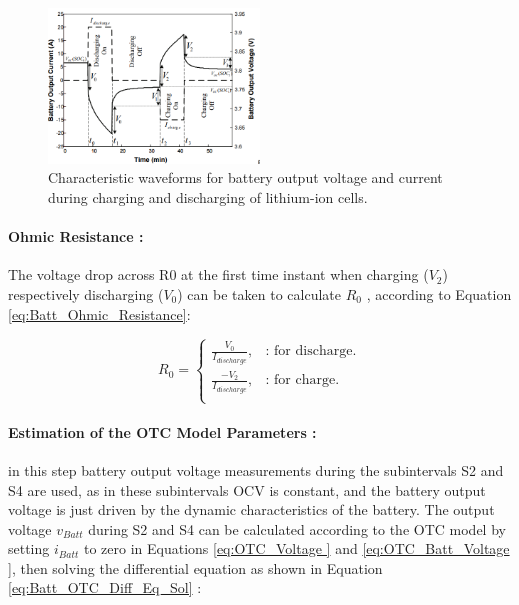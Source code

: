 \begin{figure}[h]
	\centering
	\includegraphics[width=0.5\textwidth]{Chap06/Figures/Batt_Pulsed_current_char.PNG}
	\caption{Characteristic waveforms for battery output voltage and current during charging and discharging of lithium-ion cells.}
	\label{fig:Battery_Current_Pulse}
\end{figure}

\paragraph{Ohmic Resistance :} 
The voltage drop across R0 at the 
first time instant when charging ($V_2$) respectively 
discharging ($V_0$) can be taken to calculate $R_0$ \cite{Internal_Resistance_LIPO_Batt_Gogoana}, according 
to Equation \ref{eq:Batt_Ohmic_Resistance}: 

\begin{equation}\label{eq:Batt_Ohmic_Resistance}
	R_0 =\begin{cases}
	  \frac{V_0}{I_{discharge}}, & \text{: for discharge}.\\
	  \frac{- V_2}{I_{discharge}}, & \text{: for charge}.\\
	\end{cases}
\end{equation}

\paragraph{Estimation of the OTC Model Parameters :} 
in this step 
battery output voltage measurements during the 
subintervals S2 and S4 are used, as in these subintervals 
OCV is constant\cite{Internal_Resistance_LIPO_Batt_Gogoana}, and the battery output voltage is just 
driven by the dynamic characteristics of the battery. The 
output voltage $v_{Batt}$ during S2 and S4 can be calculated 
according to the OTC model by setting $i_{Batt}$ to zero in 
Equations \ref{eq:OTC_Voltage } and \ref{eq:OTC_Batt_Voltage }, then solving the differential equation as 
shown in Equation \ref{eq:Batt_OTC_Diff_Eq_Sol} \cite {UKEMPT_AHMAD2012}:


